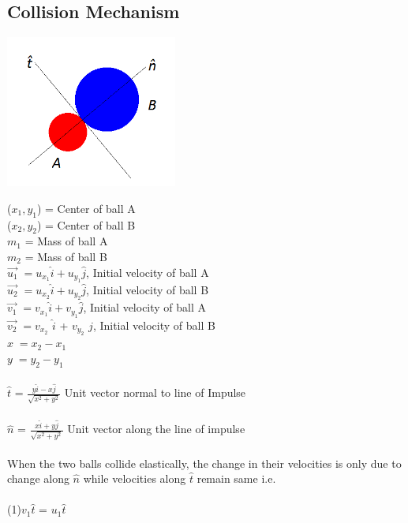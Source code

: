 \documentclass[a4paper,12pt]{report}
\begin{document}
\subsection*{Collision Mechanism}
\begin{center}
\includegraphics[height=5cm]{collision.png}\\
\end{center}
($x_{1},y_{1}$) = Center of ball A\\ 
($x_{2},y_{2}$) = Center of ball B\\
$m_{1}$ = Mass of ball A\\
$m_{2}$ = Mass of ball B\\
$\vec{u_{1}} \;= u_{x_{1}}\hat{i} + u_{y_{1}}\hat{j}$, Initial velocity of ball A\\
$\vec{u_{2}} \;= u_{x_{2}}\hat{i} + u_{y_{2}}\hat{j}$, Initial velocity of ball B\\
$\vec{v_{1}} \;= v_{x_{1}}\hat{i} + v_{y_{1}}\hat{j}$, Initial velocity of ball A\\
$\vec{v_{2}} \;= v_{x_{2}}$ $\hat{i}$ + $v_{y_{2}}$ $\hat{j}$, Initial velocity of ball B\\
$x \;= x_{2} - x_{1}$\\
$y \;= y_{2} - y_{1}$\\\\
$\hat{t}$ = $\frac{y\hat{i}-x\hat{j}}{\sqrt{x^{2}+y^{2}}}$ Unit vector normal to line of Impulse\\\\
$\hat{n}$ = $\frac{x\hat{i}+y\hat{j}}{\sqrt{x^{2}+y^{2}}}$ Unit vector along the line of impulse\\\\
When the two balls collide elastically, the change in their velocities is only due to change along $\hat{n}$ while velocities along $\hat{t}$ remain same i.e.\\\\
(1)\hspace*{3cm}$v_{1}\hat{t}$ = $u_{1}\hat{t}$\\\\
\end{document}
